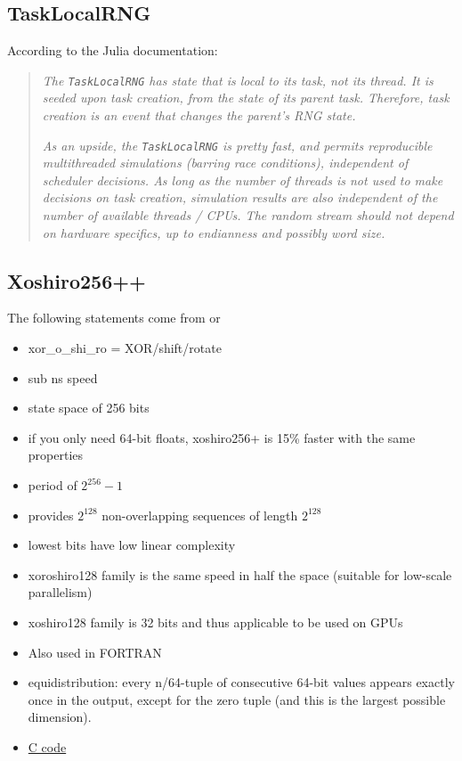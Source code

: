 \documentclass{article}
\begin{document}
        \subsection*{TaskLocalRNG}

        According to the Julia documentation\cite{Julia-2017}:

            \begin{quote}
                \textit{The \texttt{TaskLocalRNG} has state that is local to its task, not its thread. It is seeded upon task creation, from the state of its parent task. Therefore, task creation is an event that changes the parent's RNG state.}

                \textit{As an upside, the \texttt{TaskLocalRNG} is pretty fast, and permits reproducible multithreaded simulations (barring race conditions), independent of scheduler decisions. As long as the number of threads is not used to make decisions on task creation, simulation results are also independent of the number of available threads / CPUs. The random stream should not depend on hardware specifics, up to endianness and possibly word size.}
            \end{quote}

        \subsection*{Xoshiro256++}

            The following statements come from \cite{xoroshiroPaper} or \cite{shootout}
            \begin{itemize}
                \item xor\_o\_shi\_ro = XOR/shift/rotate
                \item sub ns speed
                \item state space of 256 bits
                \item if you only need 64-bit floats, xoshiro256+ is 15\% faster with the same properties
                \item period of $2^{256} - 1$
                \item provides $2^128$ non-overlapping sequences of length $2^128$
                \item lowest bits have low linear complexity
                \item xoroshiro128 family is the same speed in half the space (suitable for low-scale parallelism)
                \item xoshiro128 family is 32 bits and thus applicable to be used on GPUs
                \item Also used in FORTRAN
                \item equidistribution: every n/64-tuple of consecutive 64-bit values appears exactly once in the output, except for the zero tuple (and this is the largest possible dimension).
                \item \href{https://prng.di.unimi.it/xoshiro256plusplus.c}{C code}
            \end{itemize}
\end{document}
